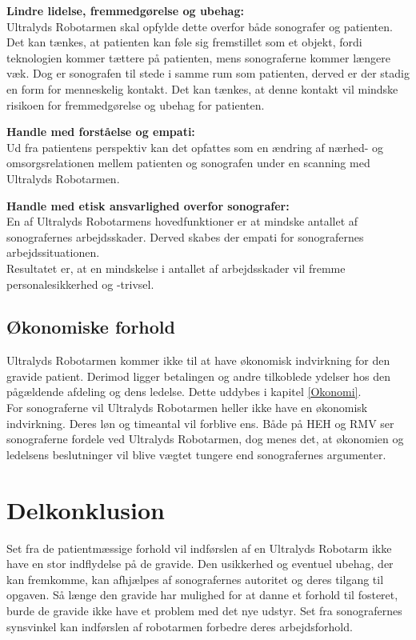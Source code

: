 \textbf{Lindre lidelse, fremmedgørelse og ubehag:}\\
Ultralyds Robotarmen skal opfylde dette overfor både sonografer og patienten. Det kan tænkes, at patienten kan føle sig fremstillet som et objekt, fordi teknologien kommer tættere på patienten, mens sonograferne kommer længere væk. Dog er sonografen til stede i samme rum som patienten, derved er der stadig en form for menneskelig kontakt. Det kan tænkes, at denne kontakt vil mindske risikoen for fremmedgørelse og ubehag for patienten.   

\textbf{Handle med forståelse og empati:}\\
Ud fra patientens perspektiv kan det opfattes som en ændring af nærhed- og omsorgsrelationen mellem patienten og sonografen under en scanning med Ultralyds Robotarmen. 

\textbf{Handle med etisk ansvarlighed overfor sonografer:}\\
En af Ultralyds Robotarmens hovedfunktioner er at mindske antallet af sonografernes arbejdsskader. Derved skabes der empati for sonografernes arbejdssituationen.\\
Resultatet er, at en mindskelse i antallet af arbejdsskader vil fremme personalesikkerhed og -trivsel.   		

\subsection{Økonomiske forhold}
Ultralyds Robotarmen kommer ikke til at have økonomisk indvirkning for den gravide patient. Derimod ligger betalingen og andre tilkoblede ydelser hos den pågældende afdeling og dens ledelse. Dette uddybes i kapitel \ref{Okonomi}. \\
For sonograferne vil Ultralyds Robotarmen heller ikke have en økonomisk indvirkning. Deres løn og timeantal vil forblive ens. 
Både på HEH og RMV ser sonograferne fordele ved Ultralyds Robotarmen, dog menes det, at økonomien og ledelsens beslutninger vil blive vægtet tungere end sonografernes argumenter.  

\section{Delkonklusion}
Set fra de patientmæssige forhold vil indførslen af en Ultralyds Robotarm ikke have en stor indflydelse på de gravide. Den usikkerhed og eventuel ubehag, der kan fremkomme, kan afhjælpes af sonografernes autoritet og deres tilgang til opgaven. Så længe den gravide har mulighed for at danne et forhold til fosteret, burde de gravide ikke have et problem med det nye udstyr. 
Set fra sonografernes synsvinkel kan indførslen af robotarmen forbedre deres arbejdsforhold. 